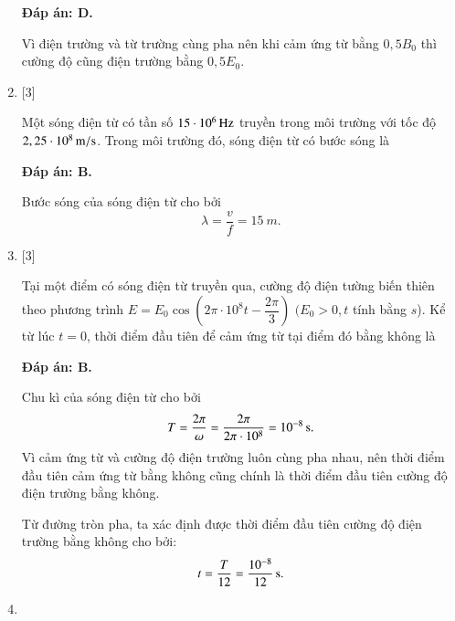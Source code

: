 \begin{enumerate}[label=\bfseries Câu \arabic*:]
	\hideall
	{		\textbf{Đáp án: D.}
		
		Vì điện trường và từ trường cùng pha nên khi cảm ứng từ bằng $0,5B_0$ thì cường độ cũng điện trường bằng $0,5E_0$.
		
	}
	
	
	\item {} [3]
	
	{Một sóng điện từ có tần  số $\xsi{15\cdot 10^{6}}{Hz}$ truyền trong môi trường với tốc độ $\xsi{2,25\cdot 10^{8}}{m/s}$. Trong môi trường đó, sóng điện từ có bước sóng là
	}
	
	\hideall
	{		\textbf{Đáp án: B.}
		
		Bước sóng của sóng điện từ cho bởi
		$$
		\lambda=\dfrac{v}{f}= \SI{15}{m}.
		$$
		
	}
	
	\item {} [3]
	
	
	{Tại một điểm có sóng điện từ truyền qua, cường độ điện tường biến thiên theo phương trình $E=E_{0} \cos \left(2 \pi \cdot 10^{8} t-\dfrac{2 \pi}{3}\right)$ $(E_{0}>0, t$ tính bằng $s$). Kể từ lúc $t=0$, thời điểm đầu tiên để cảm ứng từ tại điểm đó bằng không là
	}
	
	\hideall
	{		\textbf{Đáp án: B.}
		
		Chu kì của sóng điện từ cho bởi
		$$
		T=\dfrac{2 \pi}{\omega}=\dfrac{2 \pi}{2 \pi \cdot 10^{8}}= \xsi{10^{-8}}{s}.
		$$
		Vì cảm ứng từ và cường độ điện trường luôn cùng pha nhau, nên thời điểm đầu tiên cảm ứng từ bằng không cũng chính là thời điểm đầu tiên cường độ điện trường bằng không.
		
		Từ đường tròn pha, ta xác định được thời điểm đầu tiên cường độ điện trường bằng không cho bởi:
		$$
		t=\dfrac{T}{12}= \xsi{\dfrac{10^{-8}}{12}}{s}.
		$$
	}
		\item {} 
	

\end{enumerate}
